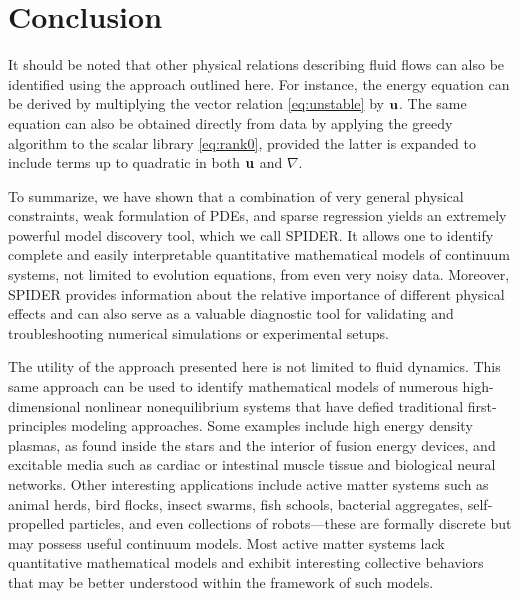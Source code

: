 \documentclass[9pt,twocolumn,twoside,lineno]{pnas-new}
\begin{document}
\section*{Conclusion}

It should be noted that other physical relations describing fluid flows can also be identified using the approach outlined here. For instance, the energy equation can be derived by multiplying the vector relation \eqref{eq:unstable} by ${\bf u}$. The same equation can also be obtained directly from data by applying the greedy algorithm to the scalar library \eqref{eq:rank0}, provided the latter is expanded to include terms up to quadratic in both ${\bf u}$ and $\nabla$.

To summarize, we have shown that a combination of very general physical constraints, weak formulation of PDEs, and sparse regression yields an extremely powerful model discovery tool, which we call SPIDER. It allows one to identify complete and easily interpretable quantitative mathematical models of continuum systems, not limited to evolution equations, from even very noisy data.
Moreover, SPIDER provides information about the relative importance of different physical effects and can also serve as a valuable diagnostic tool for validating and troubleshooting numerical simulations or experimental setups.

The utility of the approach presented here is not limited to fluid dynamics. This same approach can be used to identify mathematical models of numerous high-dimensional nonlinear nonequilibrium systems that have defied traditional first-principles modeling approaches. Some examples include high energy density plasmas, as found inside the stars and the interior of fusion energy devices, and excitable media such as cardiac or intestinal muscle tissue and biological neural networks. Other interesting applications include active matter systems such as animal herds, bird flocks, insect swarms, fish schools, bacterial aggregates, self-propelled particles, and even collections of robots---these are formally discrete but may possess useful continuum models. Most active matter systems lack quantitative mathematical models and exhibit interesting collective behaviors that may be better understood within the framework of such models.


\showacknow{} %


\end{document}
